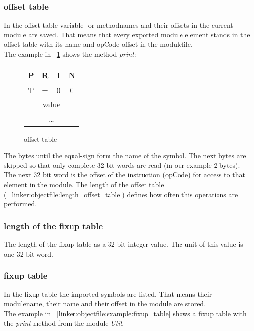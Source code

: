 \subsubsection{offset table}
\label{linker:objectfile:offset_table}
In the offset table variable- or methodnames and their offsets in the current
module are saved. That means that every exported module element stands in the
offset table with its name and opCode offset in the modulefile.  \\
The example in ~\ref{linker:objectfile:example:offset_table} shows the method
\emph{print}:

\begin{figure}[h]
	\begin{center}
		\begin{tabular}{|c|c|c|c|}
			\hline
			P &  R & I & N \\
			\hline
			T &  = &  0 & 0 \\
			\hline 
			\multicolumn{4}{|c|}{value} \\
			\hline
			\multicolumn{4}{|c|}{\ldots} \\
			\hline
		\end{tabular}
	\end{center}
	\caption{offset table}
	\label{linker:objectfile:example:offset_table}
\end{figure}

The bytes until the equal-sign form the name of the symbol. The next bytes
are skipped so that only complete 32 bit words are read (in our example 2 bytes). 
The next 32 bit word is the offset of the instruction (opCode) for access to that 
element in the module. The length of the offset table (~\ref{linker:objectfile:length_offset_table})  
defines how often this operations are performed. 

\subsubsection{length of the fixup table}
\label{linker:objectfile:length_fixup_table}
The length of the fixup table as a 32 bit integer value. The unit of this value
is one 32 bit word. 
\subsubsection{fixup table}
\label{linker:objectfile:fixup_table}
In the fixup table the imported symbols are listed. That means their modulename,
their name and their offset in the module are stored. \\
The example in ~\ref{linker:objectfile:example:fixup_table} shows a fixup table
with the \emph{print}-method from the module \emph{Util}.

